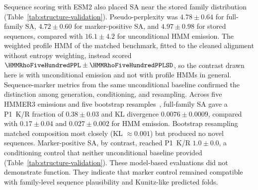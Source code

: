 Sequence scoring with ESM2 also placed SA near the stored family distribution
(Table~\ref{tab:structure-validation}). Pseudo-perplexity was $4.78\pm0.64$ for full-family SA,
$4.72\pm0.60$ for marker-positive SA, and $4.97\pm0.98$ for stored sequences, compared with
$16.1\pm4.2$ for unconditional HMM emission. The weighted profile HMM of the matched benchmark,
fitted to the cleaned alignment without entropy weighting, instead scored
$\HMMRhoFiveHundredPPL\pm\HMMRhoFiveHundredPPLSD$, so the contrast drawn here is with
unconditional emission and not with profile HMMs in general.
Sequence-marker metrics from the same unconditional baseline confirmed the distinction among
generation, conditioning, and resampling. Across five HMMER3 emissions and five bootstrap
resamples~\cite{hmmer3}, full-family SA gave a P1~K/R fraction of $0.38\pm0.03$ and KL divergence
$0.0076\pm0.0009$, compared with $0.17\pm0.04$ and $0.027\pm0.002$ for HMM emission.
Bootstrap resampling matched composition most closely (KL $\approx0.001$) but produced no novel
sequences. Marker-positive SA, by contrast, reached P1~K/R $1.0\pm0.0$, a conditioning control
that neither unconditional baseline provided (Table~\ref{tab:structure-validation}). These
model-based evaluations did not demonstrate function. They indicate that marker control remained
compatible with family-level sequence plausibility and Kunitz-like predicted folds.
